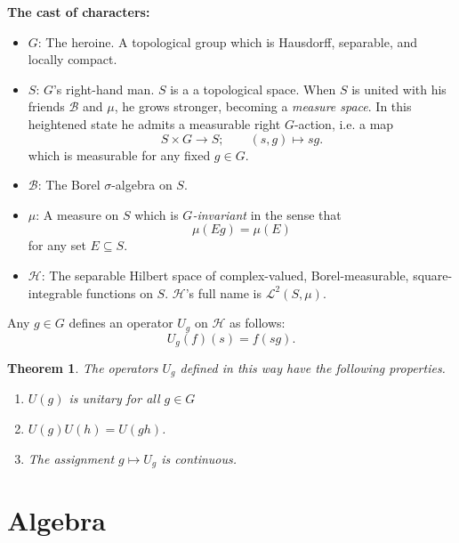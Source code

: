 \documentclass[a4paper]{report}
\theoremstyle{definition}
\theoremstyle{plain}
\newtheorem{theorem}{Theorem}[section]
\theoremstyle{remark}
\begin{document}
\textbf{The cast of characters:}
\begin{itemize}
  \item $G$: The heroine. A topological group which is Hausdorff, separable, and locally compact.

  \item $S$: $G$'s right-hand man. $S$ is a a topological space. When $S$ is united with his friends $\mathcal{B}$ and $\mu$, he grows stronger, becoming a \emph{measure space}. In this heightened state he admits a measurable right $G$-action, i.e. a map 
    \begin{equation*}
      S \times G \to S;\qquad (s, g) \mapsto sg.
    \end{equation*}
    which is measurable for any fixed $g \in G$.
    

  \item $\mathcal{B}$: The Borel $\sigma$-algebra on $S$.

  \item $\mu$: A measure on $S$ which is \emph{$G$-invariant} in the sense that 
    \begin{equation*}
      \mu(Eg) = \mu(E)
    \end{equation*}
    for any set $E \subseteq S$.

  \item $\mathscr{H}$: The separable Hilbert space of complex-valued, Borel-measurable, square-integrable functions on $S$. $\mathscr{H}$'s full name is $\mathscr{L}^{2}(S, \mu)$.
\end{itemize}

Any $g \in G$ defines an operator $U_{g}$ on $\mathscr{H}$ as follows:
\begin{equation*}
  U_{g}(f)(s) = f(sg).
\end{equation*}

\begin{theorem}
  The operators $U_{g}$ defined in this way have the following properties.
  \begin{enumerate}
    \item $U(g)$ is unitary for all $g \in G$

    \item $U(g) U(h) = U(gh)$.

    \item The assignment $g \mapsto U_{g}$ is continuous.
  \end{enumerate}
\end{theorem}

\chapter{Algebra}
\end{document}
